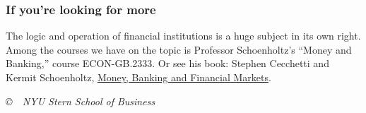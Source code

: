 \documentclass[letterpaper,12pt]{article}
\begin{document}
\subsubsection*{If you're looking for more}

The logic and operation of financial institutions is a huge subject
in its own right.  
Among the courses we have on the topic is Professor Schoenholtz's
``Money and Banking,'' course ECON-GB.2333.  
Or see his book:  
Stephen Cecchetti and Kermit Schoenholtz, 
\href{http://www.amazon.com/Banking-Financial-Markets-Stephen-Cecchetti/dp/007337590X/}
{Money, Banking and Financial Markets}.


\vfill \centerline{\it \copyright \ \number\year \ NYU Stern
School of Business}
\end{document}
